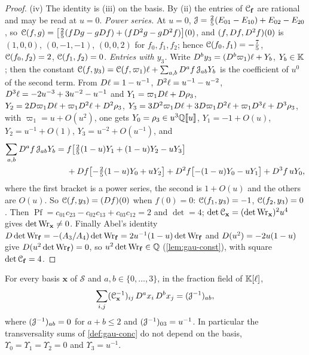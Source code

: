 \begin{proof}
(iv) The identity is (iii) on the basis. By (ii) the entries of $\mathcal{C}_{\mathbf f}$ are rational and may be read at $u=0$. \emph{Power series.} At $u=0$, $\mathcal{J}=\frac25(E_{01}-E_{10})+E_{02}-E_{20}$, so $\mathcal{C}(f,g)=\bigl[\frac25(fD g-gD f)+(fD^2g-gD^2f)\bigr](0)$, and $(f,D f,D^2f)(0)$ is $(1,0,0)$, $(0,-1,-1)$, $(0,0,2)$ for $f_0,f_1,f_2$; hence $\mathcal{C}(f_0,f_1)=-\frac75$, $\mathcal{C}(f_0,f_2)=2$, $\mathcal{C}(f_1,f_2)=0$. \emph{Entries with $y_3$.} Write $D^by_3=(D^b\varpi_1)\ell+Y_b$, $Y_b\in\mathbb{K}$; then the constant $\mathcal{C}(f,y_3)=\mathcal{C}(f,\varpi_1)\ell+\sum_{a,b}D^af\,\mathcal{J}_{ab}Y_b$ is the coefficient of $u^0$ of the second term. From $D\ell=1-u^{-1}$, $D^2\ell=u^{-1}-u^{-2}$, $D^3\ell=-2u^{-3}+3u^{-2}-u^{-1}$ and $Y_1=\varpi_1D\ell+D\rho_3$, $Y_2=2D\varpi_1D\ell+\varpi_1D^2\ell+D^2\rho_3$, $Y_3=3D^2\varpi_1D\ell+3D\varpi_1D^2\ell+\varpi_1D^3\ell+D^3\rho_3$, with $\varpi_1=u+O(u^2)$, one gets $Y_0=\rho_3\in u^3\mathbb{Q}[\![ u ]\!]$, $Y_1=-1+O(u)$, $Y_2=u^{-1}+O(1)$, $Y_3=u^{-2}+O(u^{-1})$, and
\[
\begin{aligned}\sum_{a,b}D^af\,\mathcal{J}_{ab}Y_b={}&f\bigl[\tfrac25(1-u)Y_1+(1-u)Y_2-uY_3\bigr]\\
&+D f\bigl[-\tfrac25(1-u)Y_0+uY_2\bigr]+D^2f\bigl[-(1-u)Y_0-uY_1\bigr]+D^3f\,uY_0 ,\end{aligned}
\]
where the first bracket is a power series, the second is $1+O(u)$ and the others are $O(u)$. So $\mathcal{C}(f,y_3)=(D f)(0)$ when $f(0)=0$: $\mathcal{C}(f_1,y_3)=-1$, $\mathcal{C}(f_2,y_3)=0$. Then $\operatorname{Pf}=c_{01}c_{23}-c_{02}c_{13}+c_{03}c_{12}=2$ and $\det=4$; $\det\mathcal{C}_{\mathbf x}=(\det\operatorname{Wr}_{\mathbf x})^2u^4$ gives $\det\operatorname{Wr}_{\mathbf x}\neq0$. Finally Abel's identity $D\det\operatorname{Wr}_{\mathbf f}=-(A_3/A_4)\det\operatorname{Wr}_{\mathbf f}=2u^{-1}(1-u)\det\operatorname{Wr}_{\mathbf f}$ and $D(u^2)=-2u(1-u)$ give $D(u^2\det\operatorname{Wr}_{\mathbf f})=0$, so $u^2\det\operatorname{Wr}_{\mathbf f}\in\mathbb{Q}$ (\cref{lem:gau-const}), with square $\det\mathcal{C}_{\mathbf f}=4$.
\end{proof}

\begin{lem}[Transversality]
\label{lem:gau-transv}
For every basis $\mathbf x$ of $\mathcal S$ and $a,b\in\{0,\dots,3\}$, in the fraction field of $\mathbb{K}[\ell]$,
\[
\sum_{i,j}(\mathcal{C}_{\mathbf x}^{-1})_{ij}\,D^ax_i\,D^bx_j=(\mathcal{J}^{-1})_{ab},
\]
where $(\mathcal{J}^{-1})_{ab}=0$ for $a+b\leq2$ and $(\mathcal{J}^{-1})_{03}=u^{-1}$. In particular the transversality sums of \cref{def:gau-conc} do not depend on the basis, $\Upsilon_0=\Upsilon_1=\Upsilon_2=0$ and $\Upsilon_3=u^{-1}$.
\end{lem}

